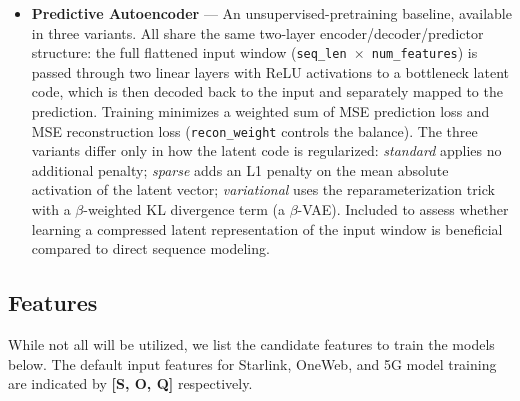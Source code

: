 \documentclass[12pt]{article}
\begin{document}
\begin{itemize}
\item \textbf{Predictive Autoencoder} — An unsupervised-pretraining baseline, available in three variants. All share the same two-layer encoder/decoder/predictor structure: the full flattened input window (\texttt{seq\_len $\times$ num\_features}) is passed through two linear layers with ReLU activations to a bottleneck latent code, which is then decoded back to the input and separately mapped to the prediction. Training minimizes a weighted sum of MSE prediction loss and MSE reconstruction loss (\texttt{recon\_weight} controls the balance). The three variants differ only in how the latent code is regularized: \emph{standard} applies no additional penalty; \emph{sparse} adds an L1 penalty on the mean absolute activation of the latent vector; \emph{variational} uses the reparameterization trick with a $\beta$-weighted KL divergence term (a $\beta$-VAE). Included to assess whether learning a compressed latent representation of the input window is beneficial compared to direct sequence modeling.

\end{itemize}

\subsection{Features}
\label{subsec: features}

While not all will be utilized, we list the candidate features to train the models below. The default input features for Starlink, OneWeb, and 5G model training are indicated by \textbf{[S, O, Q]} respectively. 
\end{document}
